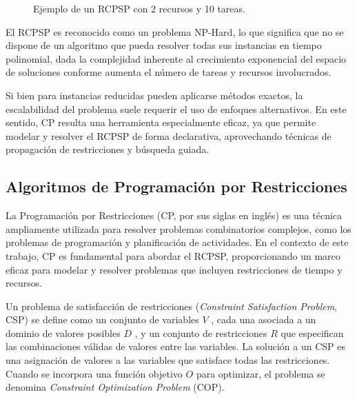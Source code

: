 \documentclass{article}
\begin{document}
\begin{figure}[htbp]
    \centering
    \caption{Ejemplo de un RCPSP con 2 recursos y 10 tareas.}
    \label{fig:rcpsp}
\end{figure}
    

El RCPSP es reconocido como un problema NP-Hard, lo que significa que no se dispone de un algoritmo que pueda resolver todas sus instancias en tiempo polinomial, dada la complejidad inherente al crecimiento exponencial del espacio de soluciones conforme aumenta el número de tareas y recursos involucrados.

Si bien para instancias reducidas pueden aplicarse métodos exactos, la escalabilidad del problema suele requerir el uso de enfoques alternativos. En este sentido, CP resulta una herramienta especialmente eficaz, ya que permite modelar y resolver el RCPSP de forma declarativa, aprovechando técnicas de propagación de restricciones y búsqueda guiada.



\subsection{Algoritmos de Programación por Restricciones}

La Programación por Restricciones (CP, por sus siglas en inglés) es una técnica ampliamente utilizada para resolver problemas combinatorios complejos, como los problemas de programación y planificación de actividades. En el contexto de este trabajo, CP es fundamental para abordar el RCPSP, proporcionando un marco eficaz para modelar y resolver problemas que incluyen restricciones de tiempo y recursos.

Un problema de satisfacción de restricciones (\textit{Constraint Satisfaction Problem}, CSP) se define como un conjunto de variables  $V$ , cada una asociada a un dominio de valores posibles  $D$ , y un conjunto de restricciones  $R$  que especifican las combinaciones válidas de valores entre las variables. La solución a un CSP es una asignación de valores a las variables que satisface todas las restricciones. Cuando se incorpora una función objetivo  $O$  para optimizar, el problema se denomina \textit{Constraint Optimization Problem} (COP)\cite{rossi2006}.
\end{document}
